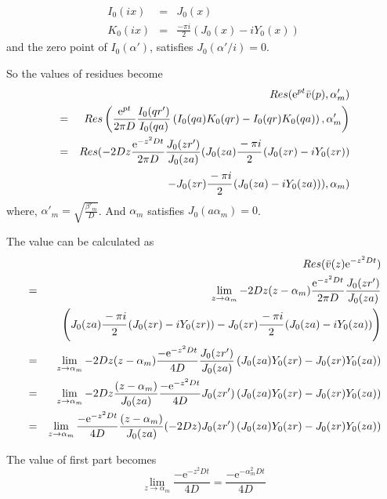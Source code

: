 \documentclass{article}
\begin{document}
\begin{eqnarray}
    I_0(ix) &=& J_0(x) \nonumber \\
    K_0(ix) &=& \frac{-\pi i}{2} (J_0(x) - iY_0(x)) \nonumber
\end{eqnarray}
and the zero point of $I_0(\alpha')$, satisfies $J_0(\alpha' / i) = 0$.

So the values of residues become
\begin{eqnarray}
    & & Res(\mathrm{e}^{pt} \bar{v}(p), \alpha'_m) \nonumber \\
    &=& Res\left(\frac{\mathrm{e}^{pt}}{2\pi D}
        \frac{I_0(qr')}{I_0(qa)}
        \left(I_0(qa)K_0(qr) - I_0(qr)K_0(qa)\right), \alpha'_m \right) \nonumber \\
        &=& Res(-2Dz\frac{\mathrm{e}^{-z^2Dt}}{2\pi D} \frac{J_0(zr')}{J_0(za)} 
        (J_0(za)\cfrac{-\pi i}{2}\left(J_0(zr) - iY_0(zr) \right) \nonumber \\
    & & - J_0(zr)\cfrac{-\pi i}{2}\left(J_0(za) - iY_0(za) \right) ), \alpha_m )\nonumber \\
\end{eqnarray}
where, $\alpha'_m = \sqrt{\frac{\beta'_m}{D}}$.
And $\alpha_m$ satisfies $J_0(a\alpha_m) = 0$.

The value can be calculated as
\begin{eqnarray}
    & & Res(\bar{v}(z)\mathrm{e}^{-z^2Dt}) \nonumber \\
    &=& \lim_{z \to \alpha_m} -2Dz(z - \alpha_m)
        \frac{\mathrm{e}^{-z^2Dt}}{2\pi D} \frac{J_0(zr')}{J_0(za)} \nonumber \\
    & & \left(J_0(za)\cfrac{-\pi i}{2}\left(J_0(zr) - iY_0(zr) \right)
        - J_0(zr)\cfrac{-\pi i}{2}\left(J_0(za) - iY_0(za) \right) \right) \nonumber \\
    &=& \lim_{z \to \alpha_m} -2Dz(z - \alpha_m)
        \frac{-\mathrm{e}^{-z^2Dt}}{4D} \frac{J_0(zr')}{J_0(za)}
        \left(J_0(za)Y_0(zr) - J_0(zr)Y_0(za) \right) \nonumber \\
    &=& \lim_{z \to \alpha_m} -2Dz \frac{(z - \alpha_m)}{J_0(za)}
        \frac{-\mathrm{e}^{-z^2Dt}}{4D} J_0(zr')
        \left(J_0(za)Y_0(zr) - J_0(zr)Y_0(za) \right) \nonumber \\
    &=& \lim_{z \to \alpha_m} \frac{-\mathrm{e}^{-z^2Dt}}{4D}
        \frac{(z - \alpha_m)}{J_0(za)}
        (-2Dz)J_0(zr')
        \left(J_0(za)Y_0(zr) - J_0(zr)Y_0(za) \right) \nonumber
\end{eqnarray}

The value of first part becomes
\begin{equation}
    \lim_{z \to \alpha_m} \frac{-\mathrm{e}^{-z^2Dt}}{4D}
    = \frac{-\mathrm{e}^{-\alpha_{m}^{2}Dt}}{4D}
\end{equation}
\end{document}
